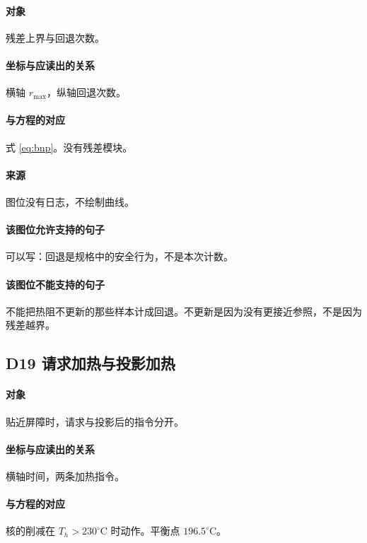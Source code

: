 \paragraph{对象}
残差上界与回退次数。

\paragraph{坐标与应读出的关系}
横轴 $r_{\max}$，纵轴回退次数。

\paragraph{与方程的对应}
式 \eqref{eq:bnp}。没有残差模块。

\paragraph{来源}
图位没有日志，不绘制曲线。

\paragraph{该图位允许支持的句子}
可以写：回退是规格中的安全行为，不是本次计数。

\paragraph{该图位不能支持的句子}
不能把热阻不更新的那些样本计成回退。不更新是因为没有更接近参照，不是因为残差越界。

\subsection{D19 请求加热与投影加热}
\paragraph{对象}
贴近屏障时，请求与投影后的指令分开。

\paragraph{坐标与应读出的关系}
横轴时间，两条加热指令。

\paragraph{与方程的对应}
核的削减在 $T_h>230^\circ\mathrm{C}$ 时动作。平衡点 $196.5^\circ\mathrm{C}$。

